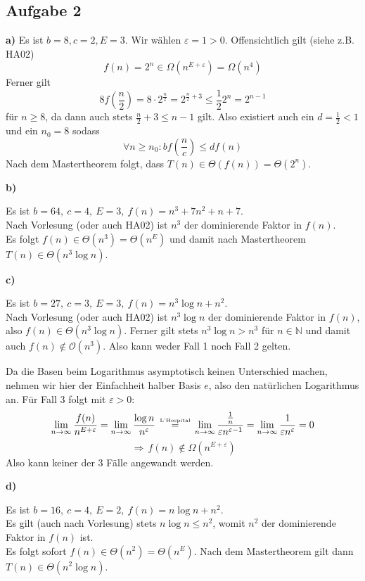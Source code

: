 \documentclass[a4paper,graphics,11pt]{article}
\newcommand{\aufgabe}[1]{\subsection*{Aufgabe #1}}
\newcommand{\up}[2]{\mathrel{\overset{\makebox[0pt]{\mbox{\normalfont\tiny #2}}}{#1}}}
\begin{document}
\newpage
\aufgabe{2}
\textbf{a)}
Es ist $b = 8, c = 2, E = 3$. Wir wählen $\varepsilon = 1 > 0$. Offensichtlich gilt (siehe z.B. HA02)
$$
    f(n) = 2^n \in \Omega(n^{E+\varepsilon}) = \Omega(n^4)
$$
Ferner gilt
$$
    8f\left(\frac{n}{2}\right)
    = 8\cdot 2^\frac{n}{2}
    = 2^{\frac{n}{2}+3}
    \leq \frac{1}{2} 2^n
    = 2^{n-1}
$$
für $n \geq 8$, da dann auch stets $\frac{n}{2} + 3 \leq n-1$ gilt. Also existiert auch ein $d = \frac{1}{2} < 1$ und ein $n_0 = 8$ sodass
$$
    \forall n \geq n_0 : bf\left(\frac{n}{c}\right) \leq df(n)
$$
Nach dem Mastertheorem folgt, dass $T(n) \in \Theta(f(n)) = \Theta(2^n)$.

\textbf{b)}

Es ist $b = 64,\ c = 4,\ E = 3,\ f(n) = n^3 + 7n^2 + n + 7$.\\
Nach Vorlesung (oder auch HA02) ist $n^3$ der dominierende Faktor in $f(n)$.\\
Es folgt $f(n) \in \Theta(n^3) = \Theta(n^E)$ und damit nach Mastertheorem $T(n) \in \Theta(n^3\log n)$.

\textbf{c)}

Es ist $b = 27,\ c = 3,\ E = 3,\ f(n) = n^3\log n + n^2$.\\
Nach Vorlesung (oder auch HA02) ist $n^3\log n$ der dominierende Faktor in $f(n)$,\\
also $f(n)\in \Theta(n^3\log n)$.
Ferner gilt stets $n^3\log n > n^3$ für $n \in \mathbb{N}$ und damit auch $f(n) \notin \mathcal{O}(n^3)$.
Also kann weder Fall 1 noch Fall 2 gelten.

Da die Basen beim Logarithmus asymptotisch keinen Unterschied machen, nehmen wir hier der Einfachheit
halber Basis $e$, also den natürlichen Logarithmus an. Für Fall 3 folgt mit $\varepsilon > 0$:
$$
    \lim_{n \to \infty} \frac{f(n)}{n^{E+\varepsilon}}
    = \lim_{n \to \infty} \frac{\log n}{n^\varepsilon}
    \ \quad\up{=}{L'Hospital}\quad\
    \lim_{n \to  \infty} \frac{\frac{1}{n}}{\varepsilon n^{\varepsilon - 1}}
    = \lim_{n \to \infty} \frac{1}{\varepsilon n^\varepsilon} = 0
$$$$
    \,\Longrightarrow\, f(n) \notin \Omega(n^{E+\varepsilon})
$$
Also kann keiner der 3 Fälle angewandt werden.

\textbf{d)}

Es ist $b = 16,\ c = 4,\ E = 2,\ f(n) = n\log n + n^2$.\\
Es gilt (auch nach Vorlesung) stets $n\log n \leq n^2$, womit $n^2$ der dominierende Faktor in $f(n)$ ist.\\
Es folgt sofort $f(n) \in \Theta(n^2) = \Theta(n^E)$.
Nach dem Mastertheorem gilt dann
$T(n) \in \Theta(n^2\log n)$.
\end{document}
